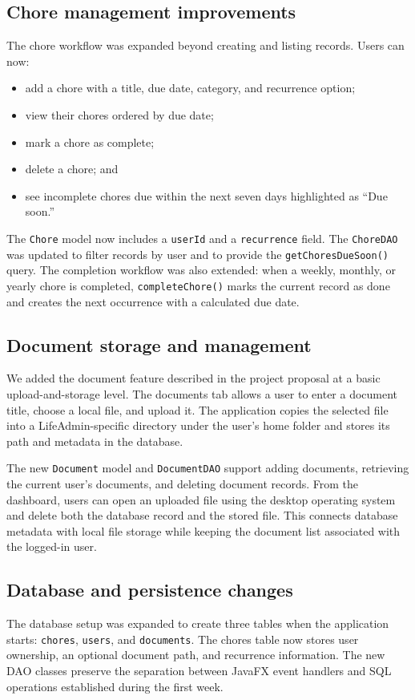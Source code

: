 \documentclass[11pt,a4paper]{article}
\begin{document}
\subsection{Chore management improvements}
The chore workflow was expanded beyond creating and listing records. Users can now:
\begin{itemize}[leftmargin=0.7cm]
    \item add a chore with a title, due date, category, and recurrence option;
    \item view their chores ordered by due date;
    \item mark a chore as complete;
    \item delete a chore; and
    \item see incomplete chores due within the next seven days highlighted as ``Due soon.''
\end{itemize}

The \texttt{Chore} model now includes a \texttt{userId} and a \texttt{recurrence} field. The \texttt{ChoreDAO} was updated to filter records by user and to provide the \texttt{getChoresDueSoon()} query. The completion workflow was also extended: when a weekly, monthly, or yearly chore is completed, \texttt{completeChore()} marks the current record as done and creates the next occurrence with a calculated due date.

\subsection{Document storage and management}
We added the document feature described in the project proposal at a basic upload-and-storage level. The documents tab allows a user to enter a document title, choose a local file, and upload it. The application copies the selected file into a LifeAdmin-specific directory under the user's home folder and stores its path and metadata in the database.

The new \texttt{Document} model and \texttt{DocumentDAO} support adding documents, retrieving the current user's documents, and deleting document records. From the dashboard, users can open an uploaded file using the desktop operating system and delete both the database record and the stored file. This connects database metadata with local file storage while keeping the document list associated with the logged-in user.

\subsection{Database and persistence changes}
The database setup was expanded to create three tables when the application starts: \texttt{chores}, \texttt{users}, and \texttt{documents}. The chores table now stores user ownership, an optional document path, and recurrence information. The new DAO classes preserve the separation between JavaFX event handlers and SQL operations established during the first week.
\end{document}
